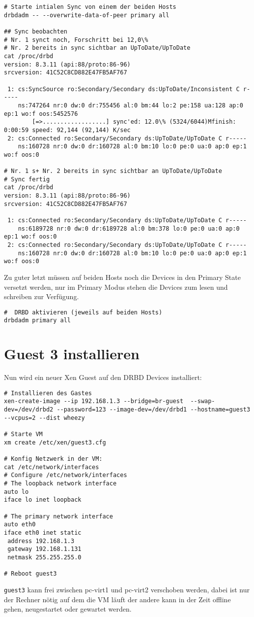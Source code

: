 \setupVerbatimOut
\begin{verbatim}
# Starte intialen Sync von einem der beiden Hosts
drbdadm -- --overwrite-data-of-peer primary all

## Sync beobachten 
# Nr. 1 synct noch, Forschritt bei 12,0\%
# Nr. 2 bereits in sync sichtbar an UpToDate/UpToDate
cat /proc/drbd 
version: 8.3.11 (api:88/proto:86-96)
srcversion: 41C52C8CD882E47FB5AF767 

 1: cs:SyncSource ro:Secondary/Secondary ds:UpToDate/Inconsistent C r-----
    ns:747264 nr:0 dw:0 dr:755456 al:0 bm:44 lo:2 pe:158 ua:128 ap:0 ep:1 wo:f oos:5452576
        [=>..................] sync'ed: 12.0\% (5324/6044)Mfinish: 0:00:59 speed: 92,144 (92,144) K/sec
 2: cs:Connected ro:Secondary/Secondary ds:UpToDate/UpToDate C r-----
    ns:160728 nr:0 dw:0 dr:160728 al:0 bm:10 lo:0 pe:0 ua:0 ap:0 ep:1 wo:f oos:0

# Nr. 1 s+ Nr. 2 bereits in sync sichtbar an UpToDate/UpToDate
# Sync fertig
cat /proc/drbd 
version: 8.3.11 (api:88/proto:86-96)
srcversion: 41C52C8CD882E47FB5AF767 

 1: cs:Connected ro:Secondary/Secondary ds:UpToDate/UpToDate C r-----
    ns:6189728 nr:0 dw:0 dr:6189728 al:0 bm:378 lo:0 pe:0 ua:0 ap:0 ep:1 wo:f oos:0
 2: cs:Connected ro:Secondary/Secondary ds:UpToDate/UpToDate C r-----
    ns:160728 nr:0 dw:0 dr:160728 al:0 bm:10 lo:0 pe:0 ua:0 ap:0 ep:1 wo:f oos:0
\end{verbatim}

Zu guter letzt müssen auf beiden Hosts noch die Devices in den Primary State versetzt werden, nur im Primary Modus stehen die Devices zum lesen und schreiben zur Verfügung.

\setupVerbatimOut
\begin{verbatim}
#  DRBD aktivieren (jeweils auf beiden Hosts)
drbdadm primary all
\end{verbatim}

\section{Guest 3 installieren}
Nun wird ein neuer Xen Guest auf den DRBD Devices installiert:
\setupVerbatimOut
\begin{verbatim}
# Installieren des Gastes
xen-create-image --ip 192.168.1.3 --bridge=br-guest  --swap-dev=/dev/drbd2 --password=123 --image-dev=/dev/drbd1 --hostname=guest3 --vcpus=2 --dist wheezy

# Starte VM
xm create /etc/xen/guest3.cfg

# Konfig Netzwerk in der VM:
cat /etc/network/interfaces
# Configure /etc/network/interfaces
# The loopback network interface
auto lo
iface lo inet loopback

# The primary network interface
auto eth0
iface eth0 inet static
 address 192.168.1.3
 gateway 192.168.1.131
 netmask 255.255.255.0
    
# Reboot guest3
\end{verbatim}

\verb|guest3| kann frei zwischen pc-virt1 und pc-virt2 verschoben werden, dabei ist nur der Rechner nötig auf dem die VM läuft der andere kann in der Zeit offline gehen, neugestartet oder gewartet werden.
